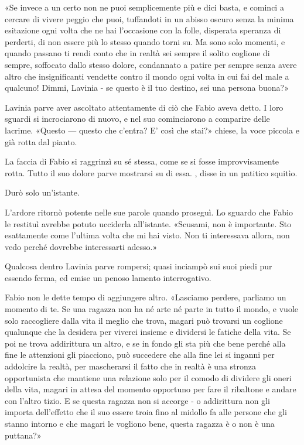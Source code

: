 «Se invece a un certo non ne puoi semplicemente più e dici
basta, e cominci a cercare di vivere peggio che puoi, tuffandoti in un
abisso oscuro senza la minima esitazione ogni volta che ne hai
l'occasione con la folle, disperata speranza di perderti, di non essere
più lo stesso quando torni su. Ma sono solo momenti, e quando passano ti
rendi conto che in realtà sei sempre il solito coglione di sempre,
soffocato dallo stesso dolore, condannato a patire per sempre senza
avere altro che insignificanti vendette contro il mondo ogni volta in
cui fai del male a qualcuno! Dimmi, Lavinia - se questo è il tuo
destino, sei una persona buona?»

Lavinia parve aver ascoltato attentamente di ciò che Fabio aveva detto.
I loro sguardi si incrociarono di nuovo, e nel suo cominciarono a
comparire delle lacrime. «Questo --- questo che c'entra? E'
così che stai?» chiese, la voce piccola e già rotta dal
pianto.

La faccia di Fabio si raggrinzì su sé stessa, come se si fosse
improvvisamente rotta. Tutto il suo dolore parve mostrarsi su di essa. ,
disse in un patitico squitìo.

Durò solo un'istante.

L'ardore ritornò potente nelle sue parole quando proseguì. Lo sguardo
che Fabio le restituì avrebbe potuto ucciderla all'istante.
«Scusami, non è importante. Sto esattamente come l'ultima
volta che mi hai visto. Non ti interessava allora, non vedo perché
dovrebbe interessarti adesso.»

Qualcosa dentro Lavinia parve rompersi; quasi inciampò sui suoi piedi
pur essendo ferma, ed emise un penoso lamento interrogativo.

Fabio non le dette tempo di aggiungere altro. «Lasciamo
perdere, parliamo un momento di te. Se una ragazza non ha né arte né
parte in tutto il mondo, e vuole solo raccogliere dalla vita il meglio
che trova, magari può trovarsi un coglione qualunque che la desidera per
viverci insieme e dividersi le fatiche della vita. Se poi ne trova
addirittura un altro, e se in fondo gli sta più che bene perché alla
fine le attenzioni gli piacciono, può succedere che alla fine lei si
inganni per addolcire la realtà, per mascherarsi il fatto che in realtà
è una stronza opportunista che mantiene una relazione solo per il comodo
di dividere gli oneri della vita, magari in attesa del momento opportuno
per fare il ribaltone e andare con l'altro tizio. E se questa ragazza
non si accorge - o addirittura non gli importa dell'effetto che il suo
essere troia fino al midollo fa alle persone che gli stanno intorno e
che magari le vogliono bene, questa ragazza è o non è una
puttana?»

